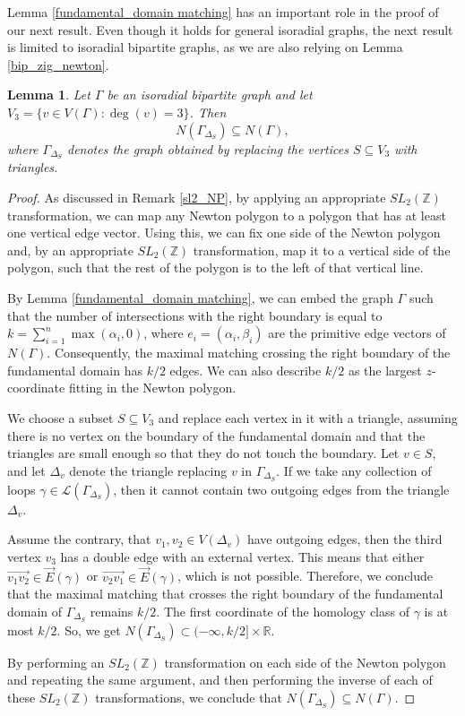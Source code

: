 \documentclass[12pt,a4paper]{article}
\newtheorem{lem}[thm]{Lemma}
\theoremstyle{definition}
\begin{document}
Lemma \ref{fundamental_domain matching} has an important role in the proof of our next result. Even though it holds for general isoradial graphs, the next result is limited to isoradial bipartite graphs, as we are also relying on Lemma \ref{bip_zig_newton}.


\begin{lem} \label{N_delta < N}
    Let $\Gamma$ be an isoradial bipartite graph and let $V_3 = \{v \in V(\Gamma): \deg(v) = 3\}$. Then
    \[N(\Gamma_{\Delta_{S}}) \subseteq N(\Gamma),\]
    where $\Gamma_{\Delta_{S}}$ denotes the graph obtained by replacing the vertices $S \subseteq V_3$ with triangles.
\end{lem}

\begin{proof}
    As discussed in Remark \ref{sl2_NP}, by applying an appropriate $SL_2(\mathbb Z)$ transformation, we can map any Newton polygon to a polygon that has at least one vertical edge vector. Using this, we can fix one side of the Newton polygon and, by an appropriate $SL_2(\mathbb Z)$ transformation, map it to a vertical side of the polygon, such that the rest of the polygon is to the left of that vertical line.

    By Lemma \ref{fundamental_domain matching}, we can embed the graph $\Gamma$ such that the number of intersections with the right boundary is equal to $k = \sum_{i=1}^n \max(\alpha_i,0)$, where $e_i = (\alpha_i, \beta_i)$ are the primitive edge vectors of $N(\Gamma)$. Consequently, the maximal matching crossing the right boundary of the fundamental domain has $k/2$ edges. We can also describe $k/2$ as the largest $z$-coordinate fitting in the Newton polygon. 

    We choose a subset $S \subseteq V_3$ and replace each vertex in it with a triangle, assuming there is no vertex on the boundary of the fundamental domain and that the triangles are small enough so that they do not touch the boundary. Let $v \in S$, and let $\Delta_v$ denote the triangle replacing $v$ in $\Gamma_{\Delta_{S}}$. If we take any collection of loops $\gamma \in \mathcal{L}(\Gamma_{\Delta_{S}})$, then it cannot contain two outgoing edges from the triangle $\Delta_v$.
    
    Assume the contrary, that $v_1, v_2 \in V(\Delta_v)$ have outgoing edges, then the third vertex $v_3$ has a double edge with an external vertex. This means that either $\overrightarrow{v_1v_2} \in \overrightarrow{E}(\gamma)$ or $\overrightarrow{v_2v_1} \in \overrightarrow{E}(\gamma)$, which is not possible. Therefore, we conclude that the maximal matching that crosses the right boundary of the fundamental domain of $\Gamma_{\Delta_S}$ remains $k/2$. The first coordinate of the homology class of $\gamma$ is at most $k/2$. So, we get $N(\Gamma_{\Delta_{S}}) \subset (-\infty, k/2] \times \mathbb{R}$.

    By performing an $SL_2(\mathbb{Z})$ transformation on each side of the Newton polygon and repeating the same argument, and then performing the inverse of each of these $SL_2(\mathbb{Z})$ transformations, we conclude that $N(\Gamma_{\Delta_{S}}) \subseteq N(\Gamma)$. 
\end{proof}
\end{document}
